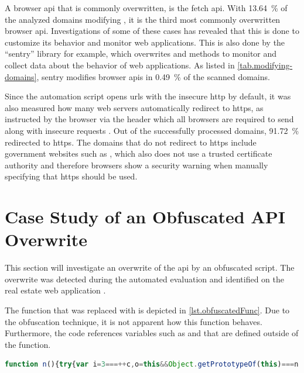 A browser \acs{api} that is commonly overwritten, is the fetch \acs{api}. With \SI[round-precision=0]{13.64}{\percent} of the analyzed domains modifying , it is the third most commonly overwritten browser \acs{api}. Investigations of some of these cases has revealed that this is done to customize its behavior and monitor web applications. This is also done by the “sentry” library for example, which overwrites  and  methods to monitor and collect data about the behavior of web applications. As listed in \autoref{tab.modifying-domains}, sentry modifies browser \acsp{api} in \SI[round-precision=2]{0.49}{\percent} of the scanned domains.

Since the automation script opens \acp{url} with the insecure \acs{http} by default, it was also measured how many web servers automatically redirect to \acs{https}, as instructed by the browser via the  header which all browsers are required to send along with insecure requests \cite{UpgradeInsecureRequests}. Out of the successfully processed domains, \SI[round-precision=0]{91.72}{\percent} redirected to \acs{https}. The domains that do not redirect to \acs{https} include government websites such as , which also does not use a trusted certificate authority and therefore browsers show a security warning when manually specifying that \acs{https} should be used.

\section{Case Study of an Obfuscated API Overwrite}
\label{sec.investigationOfObfuscatedFunc}

This section will investigate an overwrite of the  \ac{api} by an obfuscated script. The overwrite was detected during the automated evaluation and identified on the real estate web application .

The function that  was replaced with is depicted in \autoref{lst.obfuscatedFunc}. Due to the obfuscation technique, it is not apparent how this function behaves. Furthermore, the code references variables such as  and  that are defined outside of the function.

\begin{lstlisting}[language=JavaScript,breaklines=true,breakatwhitespace=false,label={lst.obfuscatedFunc},caption={Obfuscated function}]
function n(){try{var i=3===++c,o=this&&Object.getPrototypeOf(this)===n.prototype||!1,u={P:o?null:this,L:Array.prototype.slice.call(arguments),$:null},a=!1;if(i)lu(Error(),E);else if(r)try{r(u)}catch(t){a=!0}if(o?u.P=u.$=Le(t,$e(u.L)):u.$=t.apply(u.P,u.L),!i&&!a&&e)try{e(u)}catch(t){}return u.$}finally{c--}}
\end{lstlisting}

